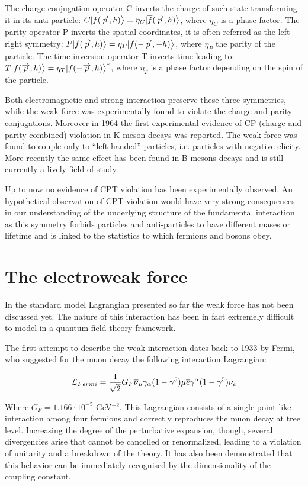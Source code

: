 The charge conjugation operator C inverts the charge of such state transforming it in its anti-particle: $C|f(\overrightarrow{p}, h)\big{>} = \eta_C|\overline{f}(\overrightarrow{p}, h)\big{>}$, where $\eta_C$ is a phase factor. The parity operator P inverts the spatial coordinates, it is often referred as the left-right symmetry: $P|f(\overrightarrow{p}, h)\big{>} = \eta_P|f(-\overrightarrow{p}, -h)\big{>}$, where $\eta_P$ the parity of the particle. The time inversion operator T inverts time leading to: $T|f(\overrightarrow{p}, h)\big{>} = \eta_T|f(-\overrightarrow{p}, h)\big{>}^*$, where $\eta_T$ is a phase factor depending on the spin of the particle.

Both electromagnetic and strong interaction preserve these three symmetries, while the weak force was experimentally found to violate the charge and parity conjugations. Moreover in 1964 the first experimental evidence of CP (charge and parity combined) violation in K meson decays \cite{PhysRevLett.13.138} was reported. The weak force was found to couple only to ``left-handed'' particles, i.e. particles with negative elicity. More recently the same effect has been found in B mesons decays and is still currently a lively field of study. 

Up to now no evidence of CPT violation has been experimentally observed. An hypothetical observation of CPT violation would have very strong consequences in our understanding of the underlying structure of the fundamental interaction as this symmetry forbids particles and anti-particles to have different mases or lifetime and is linked to the statistics to which fermions and bosons obey.

\section{The electroweak force}

In the standard model Lagrangian presented so far the weak force has not been discussed yet. The nature of this interaction has been in fact extremely difficult to model in a quantum field theory framework.

The first attempt to describe the weak interaction dates back to 1933 by Fermi, who suggested for the muon decay the following interaction Lagrangian:

\begin{equation}
\mathcal{L}_{Fermi} = \dfrac{1}{\sqrt{2}} G_F \overline{\nu}_\mu \gamma_\alpha (1-\gamma^5) \mu \overline{e} \gamma^\alpha (1-\gamma^5) \nu_e
\end{equation}

Where $G_F = 1.166 \cdot 10^{-5}$ GeV$^{-2}$. This Lagrangian consists of a single point-like interaction among four fermions and correctly reproduces the muon decay at tree level. Increasing the degree of the perturbative expansion, though, several divergencies arise that cannot be cancelled or renormalized, leading to a violation of unitarity and a breakdown of the theory. It has also been demonstrated that this behavior can be immediately recognised by the dimensionality of the coupling constant.

